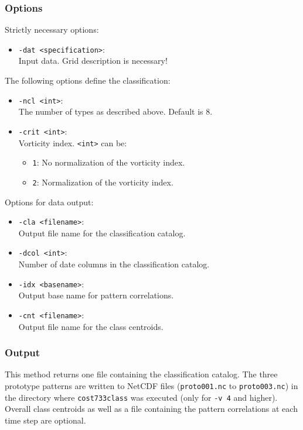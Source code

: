 \documentclass[12pt, oneside, a4paper, headsepline, plainheadsepline]{scrbook}
\begin{document}
\subsubsection*{Options}
Strictly necessary options:
\begin{itemize}
 \item \verb+-dat <specification>+:\\ Input data. Grid description is necessary!
\end{itemize}
The following options define the classification:
\begin{itemize}
 \item \verb+-ncl <int>+:\\ The number of types as described above. Default is 8.
 \item \verb+-crit <int>+:\\ Vorticity index. \verb+<int>+ can be:
 \begin{itemize}
 \item \verb+1+: No normalization of the vorticity index.
 \item \verb+2+: Normalization of the vorticity index.
 \end{itemize}
\end{itemize}
Options for data output:
\begin{itemize}
 \item \verb+-cla <filename>+:\\ Output file name for the classification catalog.
 \item \verb+-dcol <int>+:\\ Number of date columns in the classification catalog.
 \item \verb+-idx <basename>+:\\ Output base name for pattern correlations.
 \item \verb+-cnt <filename>+:\\ Output file name for the class centroids.
\end{itemize}

\subsubsection*{Output}
This method returns one file containing the classification catalog. The three prototype patterns are written to NetCDF files (\verb+proto001.nc+ to \verb+proto003.nc+) in the directory where \verb+cost733class+ was executed (only for \verb+-v 4+ and higher).
Overall class centroids as well as a file containing the pattern correlations at each time step are optional.
\end{document}
